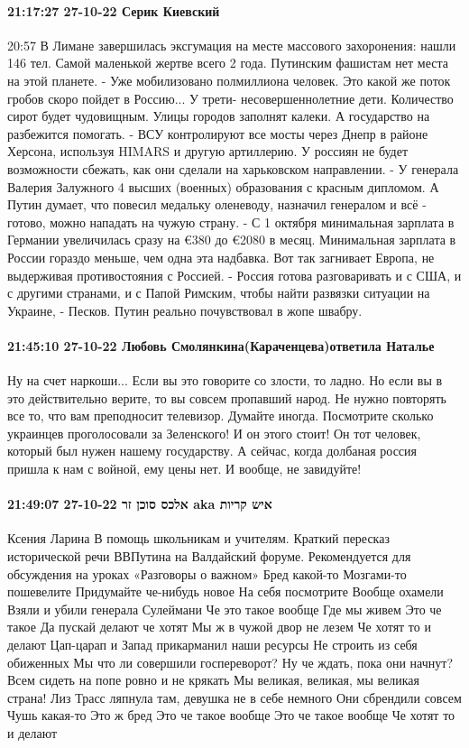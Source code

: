 \paragraph{21:17:27 27-10-22 Серик Киевский}
20:57
В Лимане завершилась эксгумация на месте массового захоронения: нашли 146 тел. Самой маленькой жертве всего 2 года.
Путинским фашистам нет места на этой планете.
-
Уже мобилизовано полмиллиона человек.
Это какой же поток гробов скоро пойдет в Россию...
У трети- несовершеннолетние дети.
Количество сирот будет чудовищным.
Улицы городов заполнят калеки.
А государство на разбежится помогать.
-
ВСУ контролируют все мосты через Днепр в районе Херсона, используя HIMARS и другую артиллерию. У россиян не будет возможности сбежать, как они сделали на харьковском направлении.
-
У генерала Валерия Залужного 4 высших (военных) образования с красным дипломом. А Путин думает, что повесил медальку оленеводу, назначил генералом и всё - готово, можно нападать на чужую страну.
-
С 1 октября минимальная зарплата в Германии увеличилась сразу на €380 до €2080 в месяц. Минимальная зарплата в России гораздо меньше, чем одна эта надбавка. Вот так загнивает Европа, не выдерживая противостояния с Россией.
-
Россия готова разговаривать и с США, и с другими странами, и с Папой Римским, чтобы найти развязки ситуации на Украине, - Песков.
Путин реально почувствовал в жопе швабру.

\paragraph{21:45:10 27-10-22 Любовь Смолянкина(Караченцева)ответила Наталье}

Ну на счет наркоши... Если вы это говорите со злости, то ладно. Но если вы в
это действительно верите, то вы совсем пропавший народ. Не нужно повторять все
то, что вам преподносит телевизор. Думайте иногда. Посмотрите сколько украинцев
проголосовали за Зеленского! И он этого стоит! Он тот человек, который был
нужен нашему государству. А сейчас, когда долбаная россия пришла к нам с
войной, ему цены нет. И вообще, не завидуйте!

\paragraph{21:49:07 27-10-22 אלכס סוכן זר aka איש קריות}

Ксения Ларина
В помощь школьникам и учителям. Краткий пересказ исторической речи ВВПутина на Валдайский форуме. Рекомендуется для обсуждения на уроках «Разговоры о важном»
Бред какой-то
Мозгами-то пошевелите
Придумайте че-нибудь новое
На себя посмотрите
Вообще охамели
Взяли и убили генерала Сулеймани
Че это такое вообще
Где мы живем
Это че такое
Да пускай делают че хотят
Мы ж в чужой двор не лезем
Че хотят то и делают
Цап-царап и Запад прикарманил наши ресурсы
Не строить из себя обиженных
Мы что ли совершили госпереворот?
Ну че ждать, пока они начнут?
Всем сидеть на попе ровно и не крякать
Мы великая, великая, мы великая страна!
Лиз Трасс ляпнула там, девушка не в себе немного
Они сбрендили совсем
Чушь какая-то
Это ж бред
Это че такое вообще
Это че такое вообще
Че хотят то и делают

